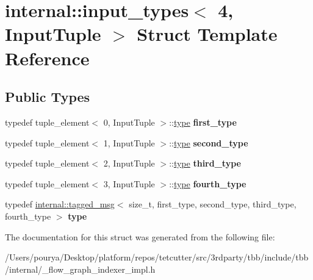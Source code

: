 \hypertarget{structinternal_1_1input__types_3_014_00_01InputTuple_01_4}{}\section{internal\+:\+:input\+\_\+types$<$ 4, Input\+Tuple $>$ Struct Template Reference}
\label{structinternal_1_1input__types_3_014_00_01InputTuple_01_4}
\subsection*{Public Types}
\begin{DoxyCompactItemize}
\item 
\hypertarget{structinternal_1_1input__types_3_014_00_01InputTuple_01_4_a1b8216cdef07b21fc5f366ab716da962}{}typedef tuple\+\_\+element$<$ 0, Input\+Tuple $>$\+::\hyperlink{classinternal_1_1tagged__msg}{type} {\bfseries first\+\_\+type}\label{structinternal_1_1input__types_3_014_00_01InputTuple_01_4_a1b8216cdef07b21fc5f366ab716da962}

\item 
\hypertarget{structinternal_1_1input__types_3_014_00_01InputTuple_01_4_a70b0f0fe7498e30bea6b19d6a07417f1}{}typedef tuple\+\_\+element$<$ 1, Input\+Tuple $>$\+::\hyperlink{classinternal_1_1tagged__msg}{type} {\bfseries second\+\_\+type}\label{structinternal_1_1input__types_3_014_00_01InputTuple_01_4_a70b0f0fe7498e30bea6b19d6a07417f1}

\item 
\hypertarget{structinternal_1_1input__types_3_014_00_01InputTuple_01_4_a5c59a6b7c03ff4f645b90d52e8577efb}{}typedef tuple\+\_\+element$<$ 2, Input\+Tuple $>$\+::\hyperlink{classinternal_1_1tagged__msg}{type} {\bfseries third\+\_\+type}\label{structinternal_1_1input__types_3_014_00_01InputTuple_01_4_a5c59a6b7c03ff4f645b90d52e8577efb}

\item 
\hypertarget{structinternal_1_1input__types_3_014_00_01InputTuple_01_4_a6d962adb6e10eb6784d875a385cac687}{}typedef tuple\+\_\+element$<$ 3, Input\+Tuple $>$\+::\hyperlink{classinternal_1_1tagged__msg}{type} {\bfseries fourth\+\_\+type}\label{structinternal_1_1input__types_3_014_00_01InputTuple_01_4_a6d962adb6e10eb6784d875a385cac687}

\item 
\hypertarget{structinternal_1_1input__types_3_014_00_01InputTuple_01_4_a5bbcfd8b4aed4ff72f56cbd281fa70f1}{}typedef \hyperlink{classinternal_1_1tagged__msg}{internal\+::tagged\+\_\+msg}$<$ size\+\_\+t, first\+\_\+type, second\+\_\+type, third\+\_\+type, fourth\+\_\+type $>$ {\bfseries type}\label{structinternal_1_1input__types_3_014_00_01InputTuple_01_4_a5bbcfd8b4aed4ff72f56cbd281fa70f1}

\end{DoxyCompactItemize}


The documentation for this struct was generated from the following file\+:\begin{DoxyCompactItemize}
\item 
/\+Users/pourya/\+Desktop/platform/repos/tetcutter/src/3rdparty/tbb/include/tbb/internal/\+\_\+flow\+\_\+graph\+\_\+indexer\+\_\+impl.\+h\end{DoxyCompactItemize}
